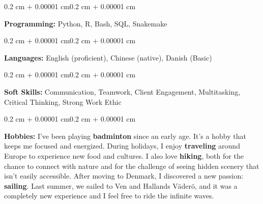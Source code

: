 \documentclass[10pt, letterpaper]{article}
\newenvironment{onecolentry}{
    \begin{adjustwidth}{0.2 cm + 0.00001 cm}{0.2 cm + 0.00001 cm}
}{
    \end{adjustwidth}
}
\begin{document}
        \begin{onecolentry}
            \textbf{Programming:} Python, R, Bash, SQL, Snakemake
        \end{onecolentry}

        \vspace{0.2 cm}

        \begin{onecolentry}
            \textbf{Languages:} English (proficient), Chinese (native), Danish (Basic)
        \end{onecolentry}

        \vspace{0.2 cm}

        \begin{onecolentry}
            \textbf{Soft Skills:} Communication, Teamwork, Client Engagement, Multitasking, Critical Thinking, Strong Work Ethic
        \end{onecolentry}

        \vspace{0.2 cm}

        \begin{onecolentry}
            \textbf{Hobbies:}
            I've been playing \textbf{badminton} since an early age. It's a hobby that keeps me focused and energized. During holidays, I enjoy \textbf{traveling} around Europe to experience new food and cultures. I also love \textbf{hiking}, both for the chance to connect with nature and for the challenge of seeing hidden scenery that isn't easily accessible. After moving to Denmark, I discovered a new passion: \textbf{sailing}. Last summer, we sailed to Ven and Hallands Väderö, and it was a completely new experience and I feel free to ride the infinite waves.
        \end{onecolentry}
\end{document}
